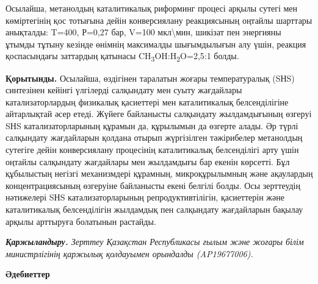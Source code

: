 \begin{multicols}{2}
Осылайша, метанолдың каталитикалық риформинг процесі арқылы сутегі мен
көміртегінің қос тотығына дейін конверсиялану реакциясының оңтайлы
шарттары анықталды: T=400, Р=0,27 бар, V=100 мкл\textbackslash мин,
шикізат пен энергияны ұтымды тұтыну кезінде өнімнің максималды
шығымдылығын алу үшін, реакция қоспасындағы заттардың қатынасы
CH\textsubscript{3}OH:H\textsubscript{2}O=2,5:1 болды.

{\bfseries Қорытынды.} Осылайша, өздігінен таралатын жоғары температуралық
(SНS) синтезінен кейінгі үлгілерді салқындату мен суыту жағдайлары
катализаторлардың физикалық қасиеттері мен каталитикалық белсенділігіне
айтарлықтай әсер етеді. Жүйеге байланысты салқындату жылдамдығының
өзгеруі SНS катализаторларының құрамын да, құрылымын да өзгерте алады.
Әр түрлі салқындату жағдайларын қолдана отырып жүргізілген тәжірибелер
метанолдың сутегіге дейін конверсиялану процесінің каталитикалық
белсенділігі арту үшін оңтайлы салқындату жағдайлары мен жылдамдығы бар
екенін көрсетті. Бұл құбылыстың негізгі механизмдері құрамның,
микроқұрылымның және ақаулардың концентрациясының өзгеруіне байланысты
екені белгілі болды. Осы зерттеудің нәтижелері SНS катализаторларының
репродуктивтілігін, қасиеттерін және каталитикалық белсенділігін
жылдамдық пен салқындату жағдайларын бақылау арқылы арттыруға болатынын
растайды.

\emph{{\bfseries Қаржыландыру.} Зерттеу Қазақстан Республикасы ғылым және
жоғары білім министрлігінің қаржылық қолдауымен орындалды (AP19677006).}
\end{multicols}

\begin{center}
{\bfseries Әдебиеттер}
\end{center}

